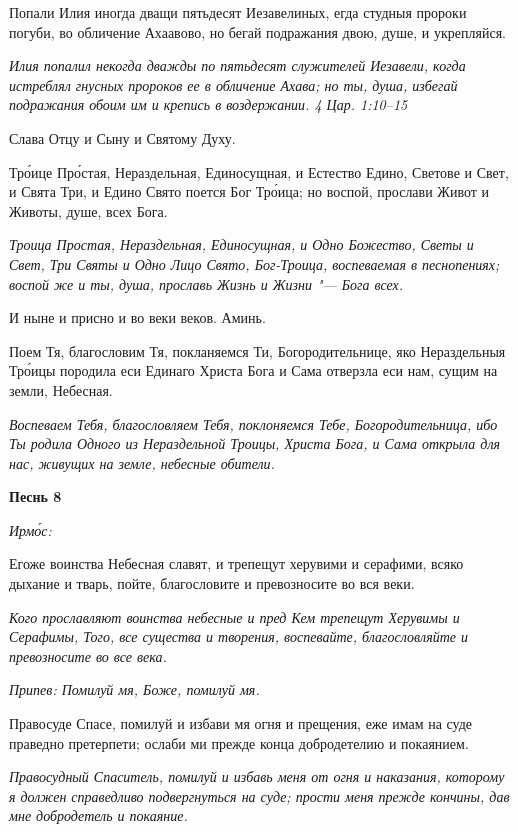 Попали Илия иногда дващи пятьдесят Иезавелиных, егда студныя пророки погуби, во обличение Ахаавово, но бегай подражания двою, душе, и укрепляйся.


\itshape Илия попалил некогда дважды по пятьдесят служителей Иезавели, когда истреблял гнусных пророков ее в обличение Ахава; но ты, душа, избегай подражания обоим им и крепись в воздержании. 4 Цар. 1:10–15\normalfont{}


Слава Отцу и Сыну и Святому Духу.


Тро́ице Про́стая, Нераздельная, Единосущная, и Естество Едино, Светове и Свет, и Свята Три, и Едино Свято поется Бог Тро́ица; но воспой, прослави Живот и Животы, душе, всех Бога.


\itshape Троица Простая, Нераздельная, Единосущная, и Одно Божество, Светы и Свет, Три Святы и Одно Лицо Свято, Бог-Троица, воспеваемая в песнопениях; воспой же и ты, душа, прославь Жизнь и Жизни "--- Бога всех.\normalfont{}


И ныне и присно и во веки веков. Аминь.


Поем Тя, благословим Тя, покланяемся Ти, Богородительнице, яко Нераздельныя Тро́ицы породила еси Единаго Христа Бога и Сама отверзла еси нам, сущим на земли, Небесная.


\itshape Воспеваем Тебя, благословляем Тебя, поклоняемся Тебе, Богородительница, ибо Ты родила Одного из Нераздельной Троицы, Христа Бога, и Сама открыла для нас, живущих на земле, небесные обители.\normalfont{}





\bfseries Песнь 8\normalfont{}


\itshape Ирмо́с:\normalfont{}


Егоже воинства Небесная славят, и трепещут херувими и серафими, всяко дыхание и тварь, пойте, благословите и превозносите во вся веки.


\itshape Кого прославляют воинства небесные и пред Кем трепещут Херувимы и Серафимы, Того, все существа и творения, воспевайте, благословляйте и превозносите во все века.\normalfont{}


\itshape Припев:\normalfont{} Помилуй мя, Боже, помилуй мя.


Правосуде Спасе, помилуй и избави мя огня и прещения, еже имам на суде праведно претерпети; ослаби ми прежде конца добродетелию и покаянием.


\itshape Правосудный Спаситель, помилуй и избавь меня от огня и наказания, которому я должен справедливо подвергнуться на суде; прости меня прежде кончины, дав мне добродетель и покаяние.\normalfont{}


